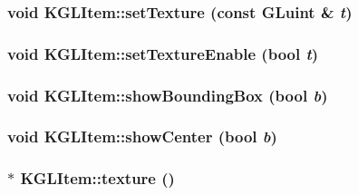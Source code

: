 \hypertarget{class_k_g_l_item_2ae8380935a0e01b35260dbb264270d5}{
\subsubsection[{setTexture}]{\setlength{\rightskip}{0pt plus 5cm}void KGLItem::setTexture (const GLuint \& {\em t})}}
\label{class_k_g_l_item_2ae8380935a0e01b35260dbb264270d5}


\hypertarget{class_k_g_l_item_e3f2d07953ada32dafa43b48a3062677}{
\subsubsection[{setTextureEnable}]{\setlength{\rightskip}{0pt plus 5cm}void KGLItem::setTextureEnable (bool {\em t})}}
\label{class_k_g_l_item_e3f2d07953ada32dafa43b48a3062677}


\hypertarget{class_k_g_l_item_f1bec83ac3d7ad0a43cee9253d482343}{
\subsubsection[{showBoundingBox}]{\setlength{\rightskip}{0pt plus 5cm}void KGLItem::showBoundingBox (bool {\em b})}}
\label{class_k_g_l_item_f1bec83ac3d7ad0a43cee9253d482343}


\hypertarget{class_k_g_l_item_defcc7f3930968a04620e378fa7ba2b6}{
\subsubsection[{showCenter}]{\setlength{\rightskip}{0pt plus 5cm}void KGLItem::showCenter (bool {\em b})}}
\label{class_k_g_l_item_defcc7f3930968a04620e378fa7ba2b6}


\hypertarget{class_k_g_l_item_d5e6b6171894e455e36994b76ccb7f97}{
\subsubsection[{texture}]{$\ast$ KGLItem::texture ()}}
\label{class_k_g_l_item_d5e6b6171894e455e36994b76ccb7f97}


